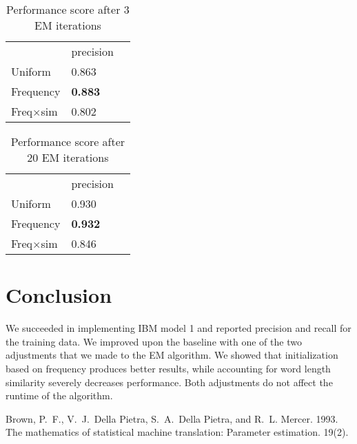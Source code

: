 \documentclass[11pt]{article}
\begin{document}
\begin{table}[H]
    \begin{tabular}{lll}
    ~ & precision \\
    Uniform & 0.863 \\
    Frequency & \textbf{0.883} \\
    Freq$\times$sim & 0.802
    \end{tabular}
    \caption{Performance score after 3 EM iterations}
\end{table}
\begin{table}[H]
    \begin{tabular}{lll}
    ~ & precision \\
    Uniform & 0.930 \\
    Frequency & \textbf{0.932} \\
    Freq$\times$sim & 0.846
    \end{tabular}
    \caption{Performance score after 20 EM iterations}
\end{table}

\section{Conclusion}
We succeeded in implementing IBM model 1 and reported precision and recall for the training data. We improved upon the baseline with one of the two adjustments that we made to the EM algorithm. We showed that initialization based on frequency produces better results, while accounting for word length similarity severely decreases performance. Both adjustments do not affect the runtime of the algorithm.

\begin{thebibliography}{}

Brown, P.~F., V.~J.~Della Pietra, S.~A.~Della Pietra, and R.~L. Mercer. 1993.
\newblock The mathematics of statistical machine translation: Parameter
  estimation.
 19(2).


\end{thebibliography}
\end{document}
